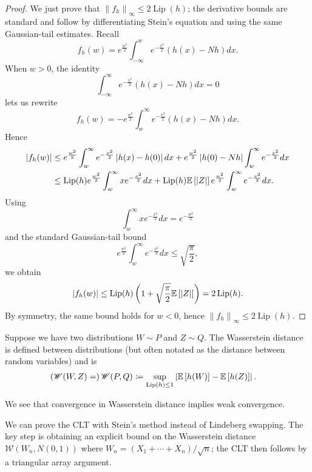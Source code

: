 \begin{proof}
	We just prove that $\left\|f_h\right\|_\infty \le 2 \operatorname{Lip}(h)$; the derivative bounds are standard and follow by differentiating Stein's equation and using the same Gaussian-tail estimates.
	Recall \[
		f_h(w) = e^{\frac{w^2}{2}} \int_{-\infty}^{w} e^{-\frac{x^2}{2}} \left( h(x) - Nh \right)dx 
	.\] When $w > 0$, the identity
	\[
		\int_{-\infty}^{\infty} e^{-\frac{x^2}{2}} \left( h(x) - Nh \right)dx = 0
	\]
	lets us rewrite
	\[
		f_h(w) = - e^{\frac{w^2}{2}} \int_{w}^{\infty}  e^{-\frac{x^2}{2}} \left( h(x) - Nh \right)dx.
	\]
	Hence
	\begin{align*}
		\left| f_h(w) \right|
		&\le e^{\frac{w^2}{2}} \int_{w}^{\infty} e^{-\frac{x^2}{2}}\left| h(x) - h(0) \right|dx + e^{\frac{w^2}{2}} \left| h(0) - Nh \right| \int_{w}^{\infty} e^{-\frac{x^2}{2}}dx \\
		&\le \operatorname{Lip}(h) e^{\frac{w^2}{2}}\int_{w}^{\infty} x e^{-\frac{x^2}{2}}dx + \operatorname{Lip}(h) \mathbb{E}\left[\left| Z \right|\right] e^{\frac{w^2}{2}} \int_{w}^{\infty} e^{-\frac{x^2}{2}}dx.
	\end{align*}
	Using
	\[
		\int_{w}^{\infty} x e^{-\frac{x^2}{2}}dx = e^{-\frac{w^2}{2}}
	\]
	and the standard Gaussian-tail bound
	\[
		e^{\frac{w^2}{2}} \int_{w}^{\infty} e^{-\frac{x^2}{2}}dx \le \sqrt{\frac{\pi}{2}},
	\]
	we obtain
	\[
		\left| f_h(w) \right| \le \operatorname{Lip}(h) \left( 1 + \sqrt{\frac{\pi}{2}} \mathbb{E}\left[\left| Z \right|\right] \right) = 2 \operatorname{Lip}(h).
	\]
	By symmetry, the same bound holds for $w < 0$, hence $\left\|f_h\right\|_\infty \le 2 \operatorname{Lip}(h)$.
\end{proof}

\begin{definition}
	Suppose we have two distributions $W \sim P$ and $Z \sim Q$. The Wasserstein distance is defined between distributions (but often notated as the distance between random variables) and is \begin{align*}
		\left( \mathscr{W}(W,Z) = \right) \mathscr{W}(P,Q) &\coloneqq \sup_{\operatorname{Lip}(h) \le 1} \left| \mathbb{E}\left[h(W)\right] - \mathbb{E}\left[h(Z)\right]  \right|
	.\end{align*} 

	We see that convergence in Wasserstein distance implies weak convergence.
\end{definition}

We can prove the CLT with Stein's method instead of Lindeberg swapping. The key step is obtaining an explicit bound on the Wasserstein distance $\mathscr{W}(W_n, N(0,1))$ where $W_n = (X_1+\cdots+X_n)/\sqrt{n}$; the CLT then follows by a triangular array argument.

